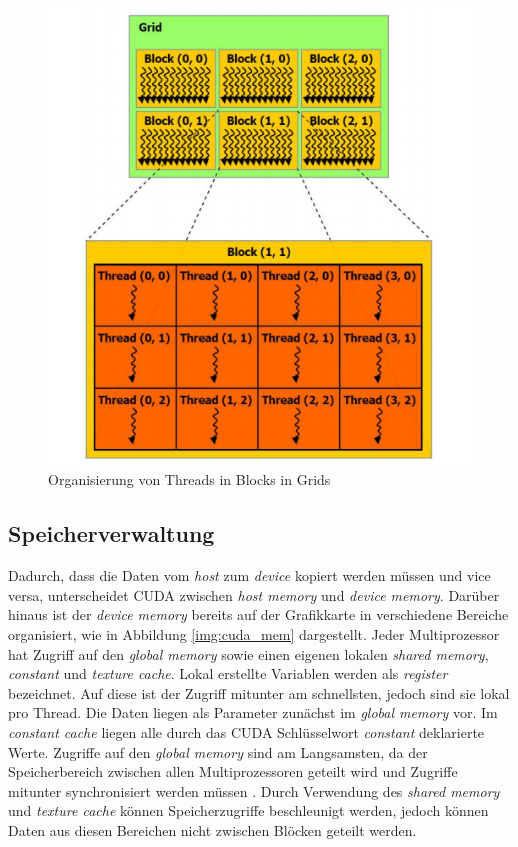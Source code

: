 \begin{figure}
	\centering
	\includegraphics[scale=0.55]{images/cuda1.png}
	\caption{Organisierung von Threads in Blocks in Grids \cite{cud2012}}
	\label{img:cuda1}
\end{figure}

\subsection{Speicherverwaltung}
\label{cudaMemory}

Dadurch, dass die Daten vom \textit{host} zum \textit{device} kopiert werden müssen und vice versa, unterscheidet CUDA zwischen \textit{host memory} und \textit{device memory}. Darüber hinaus ist der \textit{device memory} bereits auf der Grafikkarte in verschiedene Bereiche organisiert, wie in Abbildung \ref{img:cuda_mem} dargestellt. Jeder Multiprozessor hat Zugriff auf den \textit{global memory} sowie einen eigenen lokalen \textit{shared memory}, \textit{constant} und \textit{texture cache}. Lokal erstellte Variablen werden als \textit{register} bezeichnet. Auf diese ist der Zugriff mitunter am schnellsten, jedoch sind sie lokal pro Thread. Die Daten liegen als Parameter zunächst im \textit{global memory} vor. Im \textit{constant cache} liegen alle durch das CUDA Schlüsselwort \textit{\textunderscore\textunderscore constant\textunderscore\textunderscore} deklarierte Werte. Zugriffe auf den \textit{global memory} sind am Langsamsten, da der Speicherbereich zwischen allen Multiprozessoren geteilt wird und Zugriffe mitunter synchronisiert werden müssen . Durch Verwendung des \textit{shared memory} und \textit{texture cache} können Speicherzugriffe beschleunigt werden, jedoch können Daten aus diesen Bereichen nicht zwischen Blöcken geteilt werden.

